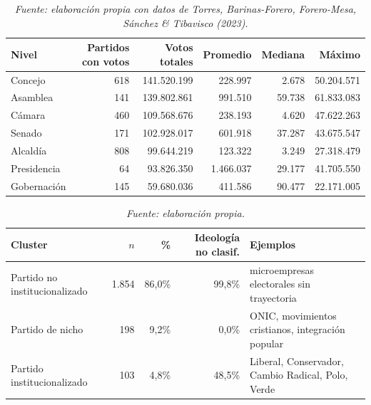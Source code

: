 \documentclass[11pt,letterpaper]{article}
\begin{document}
\begin{table}[htbp]
\centering
\small
\caption{Estadística descriptiva de los votos históricos por nivel (1958--2023)}
\label{tab:A8}
\begin{tabular}{@{}lrrrrr@{}}
\toprule
Nivel & Partidos con votos & Votos totales & Promedio & Mediana & Máximo \\
\midrule
Concejo & 618 & 141.520.199 & 228.997 & 2.678 & 50.204.571 \\
Asamblea & 141 & 139.802.861 & 991.510 & 59.738 & 61.833.083 \\
Cámara & 460 & 109.568.676 & 238.193 & 4.620 & 47.622.263 \\
Senado & 171 & 102.928.017 & 601.918 & 37.287 & 43.675.547 \\
Alcaldía & 808 & 99.644.219 & 123.322 & 3.249 & 27.318.479 \\
Presidencia & 64 & 93.826.350 & 1.466.037 & 29.177 & 41.705.550 \\
Gobernación & 145 & 59.680.036 & 411.586 & 90.477 & 22.171.005 \\
\bottomrule
\end{tabular}
\vspace{0.3em}
\caption*{\footnotesize\color{mutedgray}\itshape Fuente: elaboración propia con datos de Torres, Barinas-Forero, Forero-Mesa, Sánchez \& Tibavisco (2023).}
\end{table}

\begin{table}[htbp]
\centering
\small
\caption{Clusters del segundo nivel: tamaño y composición ideológica}
\label{tab:A9}
\begin{tabular}{@{}lrrrp{4cm}@{}}
\toprule
Cluster & $n$ & \% & Ideología no clasif. & Ejemplos \\
\midrule
Partido no institucionalizado & 1.854 & 86,0\% & 99,8\% & microempresas electorales sin trayectoria \\
Partido de nicho & 198 & 9,2\% & 0,0\% & ONIC, movimientos cristianos, integración popular \\
Partido institucionalizado & 103 & 4,8\% & 48,5\% & Liberal, Conservador, Cambio Radical, Polo, Verde \\
\bottomrule
\end{tabular}
\vspace{0.3em}
\caption*{\footnotesize\color{mutedgray}\itshape Fuente: elaboración propia.}
\end{table}
\end{document}
